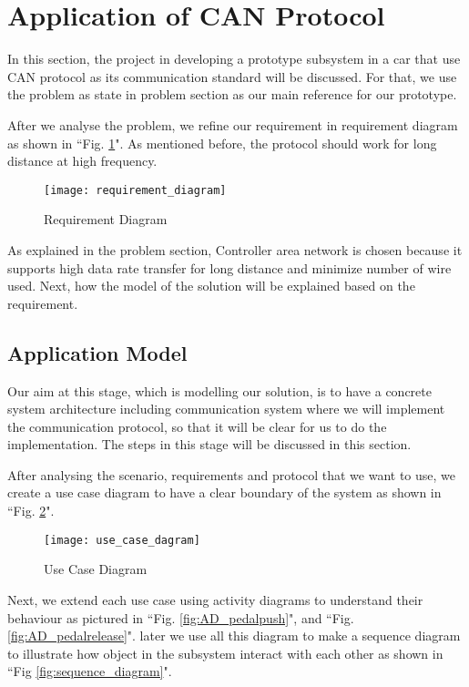 
\section{Application of CAN Protocol}

In this section,  the  project in  developing a prototype subsystem in a car that use CAN protocol as its communication standard will be discussed. For that, we use the problem as state in problem section as our main  reference for our prototype.

After we analyse the problem, we refine our requirement in requirement diagram as shown in ``Fig. \ref{fig:requirement_diagram}". As mentioned before, the protocol should work for long distance at high frequency.

\begin{figure}[h]
    \centering
    \texttt{[image: requirement\_diagram]}
    \caption{Requirement Diagram}
    \label{fig:requirement_diagram}
\end{figure}

As explained in the problem section, Controller area network is chosen because it supports high data rate transfer for long distance and minimize number of wire used. Next, how the model of the solution will be explained based on the requirement.

\subsection{Application Model}

Our aim at this stage, which is modelling our solution, is to have a concrete system architecture including communication system where we will implement the communication protocol, so that it will be clear for us to do the implementation. The steps in this stage will be discussed in this section.

After analysing the scenario, requirements and protocol that we want to use, we create a use case diagram to have a clear boundary of the system as shown in ``Fig. \ref{fig:use_case_dagram}".

\begin{figure}[h]
    \centering
    \texttt{[image: use\_case\_dagram]}
    \caption{Use Case Diagram}
    \label{fig:use_case_dagram}
\end{figure}

Next, we extend each use case using activity diagrams to understand their behaviour as pictured in ``Fig. \ref{fig:AD_pedalpush}", and  ``Fig. \ref{fig:AD_pedalrelease}". later we use all this diagram to make a sequence diagram to illustrate how object in the subsystem interact with each other as shown in ``Fig \ref{fig:sequence_diagram}".

